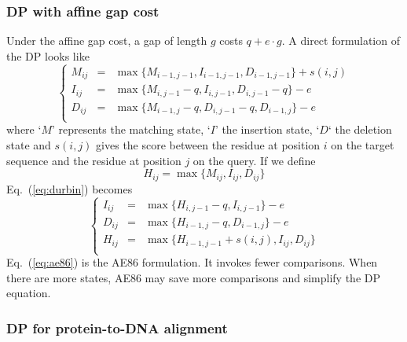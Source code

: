 \documentclass{bioinfo}
\begin{document}
\begin{methods}
\subsubsection{DP with affine gap cost}

Under the affine gap cost, a gap of length $g$ costs $q+e\cdot g$. A direct
formulation of the DP looks like
\begin{equation}\label{eq:durbin}
\left\{\begin{array}{lll}
M_{ij}&=&\max\{ M_{i-1,j-1}, I_{i-1,j-1}, D_{i-1,j-1} \} + s(i,j) \\
I_{ij}&=&\max\{ M_{i,j-1} - q, I_{i,j-1}, D_{i,j-1} - q \} - e\\
D_{ij}&=&\max\{ M_{i-1,j} - q, D_{i,j-1} - q, D_{i-1,j} \} - e\\
\end{array}\right.
\end{equation}
where `$M$' represents the matching state, `$I$' the insertion state, `$D$` the
deletion state and $s(i,j)$ gives the score between the residue at position $i$
on the target sequence and the residue at position $j$ on the query. If we
define
$$
H_{ij} = \max\{M_{ij},I_{ij},D_{ij}\}
$$
Eq.~(\ref{eq:durbin}) becomes
\begin{equation}\label{eq:ae86}
\left\{\begin{array}{lll}
I_{ij}&=&\max\{ H_{i,j-1} - q, I_{i,j-1} \} - e\\
D_{ij}&=&\max\{ H_{i-1,j} - q, D_{i-1,j} \} - e\\
H_{ij}&=&\max\{ H_{i-1,j-1} + s(i,j), I_{ij}, D_{ij} \} \\
\end{array}\right.
\end{equation}
Eq.~(\ref{eq:ae86}) is the AE86 formulation. It invokes fewer comparisons. When
there are more states, AE86 may save more comparisons and simplify the DP
equation.

\subsubsection{DP for protein-to-DNA alignment}


\end{methods}
\end{document}

